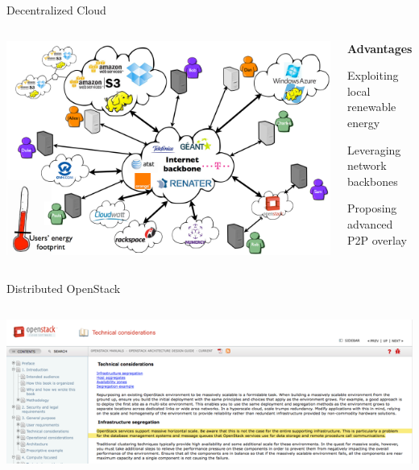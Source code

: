 \documentclass[final,t]{beamer}
\begin{document}
\begin{frame}[fragile]{}
\begin{columns}[t]
\begin{column}{.49\linewidth}
      \begin{block}{\Large Decentralized Cloud}
        \begin{columns}[T]
        \begin{column}{0.73\linewidth}
	\begin{center}
        \includegraphics[width=1.\linewidth]{images/cloud-decentralise.png}
        \end{center}
        \end{column}
        \begin{column}{0.23\linewidth}
        \textbf{\Large Advantages}
        \begin{itemize}
        \begin{Large}
        \item Exploiting local renewable energy
        \item Leveraging network backbones
        \item Proposing advanced P2P overlay
        \end{Large}
        \end{itemize}
        \end{column}
        \end{columns}
      \end{block}

      \begin{block}{\Large Distributed OpenStack}
        \begin{columns}[T]

          \begin{column}{0.95\linewidth}
           \begin{flushright}
           \vspace{-4cm}
           \includegraphics[width=.62\linewidth]{images/screenshot.png}
           \end{flushright}


\end{column}
\end{columns}
\end{block}
\end{column}
\end{columns}
\end{frame}
\end{document}
